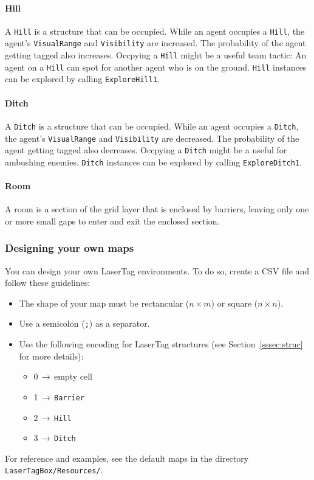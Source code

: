 \documentclass[
  a4paper,
  english,
  DIV=16,
  11pt,
  parskip=half,
  dvipsnames,
  listof=totoc,		     %
  index=totoc,		     %
  bibliography=totoc,	 %
]{scrartcl}
\begin{document}
\paragraph{Hill} \label{par:hillDesc}
A \texttt{Hill} is a structure that can be occupied. While an agent occupies a \texttt{Hill}, the agent's \texttt{VisualRange} and \texttt{Visibility} are increased. The probability of the agent getting tagged also increases. Occpying a \texttt{Hill} might be a useful team tactic: An agent on a \texttt{Hill} can spot for another agent who is on the ground. \texttt{Hill} instances can be explored by calling \texttt{ExploreHill1}.
%
\paragraph{Ditch} \label{par:ditchDesc}
A \texttt{Ditch} is a structure that can be occupied. While an agent occupies a \texttt{Ditch}, the agent's \texttt{VisualRange} and \texttt{Visibility} are decreased. The probability of the agent getting tagged also decreases. Occpying a \texttt{Ditch} might be a useful for ambushing enemies. \texttt{Ditch} instances can be explored by calling \texttt{ExploreDitch1}.
%
\paragraph{Room} \label{par:roomDesc}
A room is a section of the grid layer that is enclosed by barriers, leaving only one or more small gaps to enter and exit the enclosed section.
%
\subsubsection{Designing your own maps}
%
You can design your own LaserTag environments. To do so, create a CSV file and follow these guidelines:
%
\begin{itemize}
  \item The shape of your map must be rectancular ($n \times m$) or square ($n \times n$).
  \item Use a semicolon (\texttt{;}) as a separator.
  \item Use the following encoding for LaserTag structures (see Section~\ref{sssec:struc} for more details):
  \begin{itemize}
    \item 0$\,\to\,$empty cell
    \item 1$\,\to\,$\texttt{Barrier}
    \item 2$\,\to\,$\texttt{Hill}
    \item 3$\,\to\,$\texttt{Ditch}
  \end{itemize}
\end{itemize}
%
For reference and examples, see the default maps in the directory \texttt{LaserTagBox/Resources/}.
%
\end{document}
